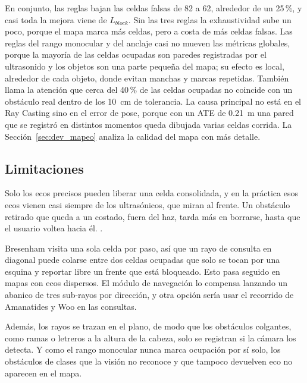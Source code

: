 En conjunto, las reglas bajan las celdas falsas de 82 a 62, alrededor de un 25\,\%, y
casi toda la mejora viene de $L_{block}$. Sin las tres reglas la exhaustividad sube un
poco, porque el mapa marca más celdas, pero a costa de más celdas falsas. Las reglas del
rango monocular y del anclaje casi no mueven las métricas globales, porque la mayoría
de las celdas ocupadas son paredes registradas por el ultrasonido y los objetos son una
parte pequeña del mapa; su efecto es local, alrededor de cada objeto, donde evitan
manchas y marcas repetidas. También llama la atención que cerca del 40\,\% de las celdas
ocupadas no coincide con un obstáculo real dentro de los 10~cm de tolerancia. La causa
principal no está en el Ray Casting sino en el error de pose, porque con un ATE de
0.21~m una pared que se registró en distintos momentos queda dibujada varias celdas
corrida. La Sección~\ref{sec:dev_mapeo} analiza la calidad del mapa con más detalle.

\subsection{Limitaciones}

Solo los ecos precisos pueden liberar una celda consolidada, y en la práctica esos ecos
vienen casi siempre de los ultrasónicos, que miran al frente. Un obstáculo retirado que
queda a un costado, fuera del haz, tarda más en borrarse, hasta que el usuario voltea
hacia él. .

Bresenham visita una sola celda por paso, así que un rayo de consulta en diagonal puede
colarse entre dos celdas ocupadas que solo se tocan por una esquina y reportar libre un
frente que está bloqueado. Esto pasa seguido en mapas con ecos dispersos. El módulo de
navegación lo compensa lanzando un abanico de tres sub-rayos por dirección, y otra
opción sería usar el recorrido de Amanatides y Woo en las consultas.

Además, los rayos se trazan en el plano, de modo que los obstáculos colgantes, como
ramas o letreros a la altura de la cabeza, solo se registran si la cámara los detecta.
Y como el rango monocular nunca marca ocupación por sí solo, los obstáculos de clases que
la visión no reconoce y que tampoco devuelven eco no aparecen en el mapa.
